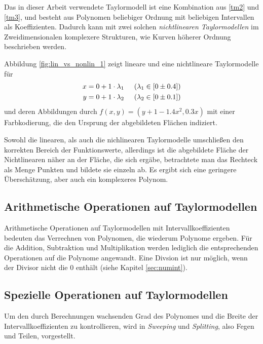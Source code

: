 Das in dieser Arbeit verwendete Taylormodell ist eine Kombination aus \ref{tm2} und \ref{tm3}, und besteht aus Polynomen beliebiger Ordnung mit beliebigen Intervallen als Koeffizienten. Dadurch kann mit zwei solchen \textit{nichtlinearen Taylormodellen} im Zweidimensionalen komplexere Strukturen, wie Kurven höherer Ordnung beschrieben werden.

Abbildung \ref{fig:lin_vs_nonlin_1} zeigt lineare und eine nichtlineare Taylormodelle für
\begin{align*}
x = 0 + 1 \cdot \lambda_1 & \hspace{0.5cm} (\lambda_1 \in [0 \pm 0.4]) \\
 y = 0 + 1 \cdot \lambda_2 & \hspace{0.5cm} (\lambda_2 \in [0 \pm 0.1])
\end{align*}
und deren Abbildungen durch $f(x,y) = (y + 1- 1.4 x^2,0.3x)$ mit einer Farbkodierung, die den Ursprung der abgebildeten Flächen indiziert.


Sowohl die linearen, als auch die nichlinearen Taylormodelle umschließen den korrekten Bereich der Funktionswerte, allerdings ist die abgebildete Fläche der Nichtlinearen näher an der Fläche, die sich ergäbe, betrachtete man das Rechteck als Menge Punkten und bildete sie einzeln ab. Es ergibt sich eine geringere Überschätzung, aber auch ein komplexeres Polynom.


\subsection{Arithmetische Operationen auf Taylormodellen}

Arithmetische Operationen auf Taylormodellen mit Intervallkoeffizienten bedeuten das Verrechnen von Polynomen, die wiederum Polynome ergeben. Für die Addition, Subtraktion und Multiplikation werden lediglich die entsprechenden Operationen auf die Polynome angewandt. Eine Divsion ist nur möglich, wenn der Divisor nicht die 0 enthält (siehe Kapitel \ref{sec:numint}).




    \subsection{Spezielle Operationen auf Taylormodellen}
Um den durch Berechnungen wachsenden Grad des Polynomes und die Breite der Intervallkoeffizienten zu kontrollieren, wird in \cite{DBLP:conf/macis/BrausseKM15} \textit{Sweeping} und \textit{Splitting}, also Fegen und Teilen, vorgestellt. 

